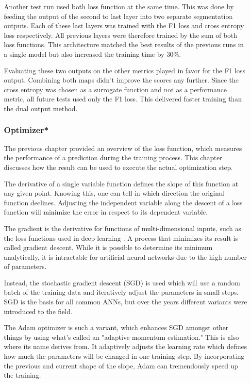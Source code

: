 Another test run used both loss function at the same time. This was done by feeding the output of the second to last layer into two separate segmentation outputs. Each of these last layers was trained with the F1 loss and cross entropy loss respectively. All previous layers were therefore trained by the sum of both loss functions. This architecture matched the best results of the previous runs in a single model but also increased the training time by 30\%.

Evaluating these two outputs on the other metrics played in favor for the F1 loss output. Combining both maps didn't improve the scores any further. Since the cross entropy was chosen as a surrogate function and not as a performance metric, all future tests used only the F1 loss. This delivered faster training than the dual output method.

\subsubsection{Optimizer*}

The previous chapter provided an overview of the loss function, which measures the performance of a prediction during the training process. This chapter discusses how the result can be used to execute the actual optimization step.

The derivative of a single variable function defines the slope of this function at any given point. Knowing this, one can tell in which direction the original function declines. Adjusting the independent variable along the descent of a loss function will minimize the error in respect to its dependent variable.

The gradient is the derivative for functions of multi-dimensional inputs, such as the loss functions used in deep learning \cite{Chollet2017}. A process that minimizes its result is called gradient descent. While it is possible to determine its minimum analytically, it is intractable for artificial neural networks due to the high number of parameters.

Instead, the stochastic gradient descent (SGD) is used which will use a random batch of the training data and iteratively adjust the parameters in small steps. SGD is the basis for all common ANNs, but over the years different variants were introduced to the field.

The Adam optimizer is such a variant, which enhances SGD amongst other things by using what's called an "adaptive momentum estimation." This is also where its name derives from. It adaptively adjusts the learning rate which defines how much the parameters will be changed in one training step. By incorporating the previous and current shape of the slope, Adam can tremendously speed up the training.

